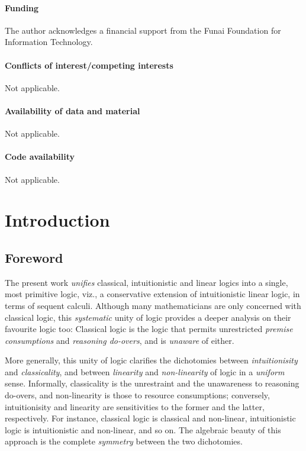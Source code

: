 \documentclass[a4paper]{article}
\theoremstyle{definition}
\theoremstyle{theorem}
\theoremstyle{remark}
\begin{document}
\paragraph{Funding}
The author acknowledges a financial support from the Funai Foundation for Information Technology.

\paragraph{Conflicts of interest/competing interests}
Not applicable.

\paragraph{Availability of data and material}
Not applicable.

\paragraph{Code availability}
Not applicable.
\fi





\section{Introduction}
\label{Introduction}
\subsection{Foreword}
\label{Foreword}
The present work \emph{unifies} classical, intuitionistic and linear logics into a single, most primitive logic, viz., a conservative extension of intuitionistic linear logic, in terms of sequent calculi.
Although many mathematicians are only concerned with classical logic, this \emph{systematic} unity of logic provides a deeper analysis on their favourite logic too: Classical logic is the logic that permits unrestricted \emph{premise consumptions} and \emph{reasoning do-overs}, and is \emph{unaware} of either.

More generally, this unity of logic clarifies the dichotomies between \emph{intuitionisity} and \emph{classicality}, and between \emph{linearity} and \emph{non-linearity} of logic in a \emph{uniform} sense.
Informally, classicality is the unrestraint and the unawareness to reasoning do-overs, and non-linearity is those to resource consumptions; conversely, intuitionisity and linearity are sensitivities to the former and the latter, respectively.
For instance, classical logic is classical and non-linear, intuitionistic logic is intuitionistic and non-linear, and so on.
The algebraic beauty of this approach is the complete \emph{symmetry} between the two dichotomies.
\end{document}
